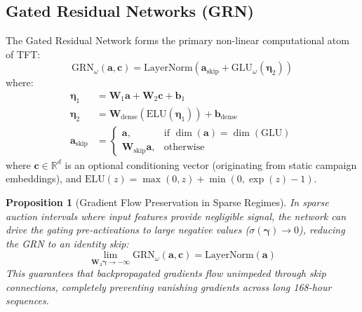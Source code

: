 \documentclass[11pt,a4paper]{article}
\newtheorem{proposition}[theorem]{Proposition}
\begin{document}
\subsection{Gated Residual Networks (GRN)}
The Gated Residual Network forms the primary non-linear computational atom of TFT:
\begin{equation}
    \mathrm{GRN}_\omega(\mathbf{a}, \mathbf{c}) = \mathrm{LayerNorm}\left(\mathbf{a}_{\text{skip}} + \mathrm{GLU}_\omega\left(\boldsymbol{\eta}_2\right)\right)
\end{equation}
where:
\begin{align}
    \boldsymbol{\eta}_1 &= \mathbf{W}_1 \mathbf{a} + \mathbf{W}_2 \mathbf{c} + \mathbf{b}_1 \\
    \boldsymbol{\eta}_2 &= \mathbf{W}_{\text{dense}} \left(\mathrm{ELU}(\boldsymbol{\eta}_1)\right) + \mathbf{b}_{\text{dense}} \\
    \mathbf{a}_{\text{skip}} &= \begin{cases}
        \mathbf{a}, & \text{if } \dim(\mathbf{a}) = \dim(\mathrm{GLU}) \\
        \mathbf{W}_{\text{skip}} \mathbf{a}, & \text{otherwise}
    \end{cases}
\end{align}
where $\mathbf{c} \in \mathbb{R}^d$ is an optional conditioning vector (originating from static campaign embeddings), and $\mathrm{ELU}(z) = \max(0, z) + \min(0, \exp(z) - 1)$.

\begin{proposition}[Gradient Flow Preservation in Sparse Regimes]
In sparse auction intervals where input features provide negligible signal, the network can drive the gating pre-activations to large negative values ($\sigma(\boldsymbol{\gamma}) \to 0$), reducing the GRN to an identity skip:
\begin{equation}
    \lim_{\mathbf{W}_3 \boldsymbol{\gamma} \to -\infty} \mathrm{GRN}_\omega(\mathbf{a}, \mathbf{c}) = \mathrm{LayerNorm}(\mathbf{a})
\end{equation}
This guarantees that backpropagated gradients flow unimpeded through skip connections, completely preventing vanishing gradients across long 168-hour sequences.
\end{proposition}
\end{document}
